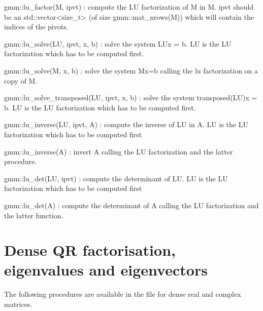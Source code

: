 \documentclass[11pt,a4paper]{article}
\begin{document}
\begin{cppcode}
gmm::lu_factor(M, ipvt) : compute the LU factorization of M in M. ipvt should be
                     an std::vector<size_t> (of size gmm::mat_nrows(M))
                     which will contain the indices of the pivots.

gmm::lu_solve(LU, ipvt, x, b) : solve the system LUx = b. LU is the LU
                           factorization which has to be computed first.

gmm::lu_solve(M, x, b) : solve the system Mx=b calling the lu factorization on
                    a copy of M.

gmm::lu_solve_transposed(LU, ipvt, x, b) : solve the system transposed(LU)x = b.
                                      LU is the LU factorization which
                                      has to be computed first.

gmm::lu_inverse(LU, ipvt, A) : compute the inverse of LU in A. LU is the LU
                          factorization which has to be computed first

gmm::lu_inverse(A) : invert A calling the LU factorization and the latter
                procedure.

gmm::lu_det(LU, ipvt) : compute the determinant of LU. LU is the LU
                   factorization which has to be computed first

gmm::lu_det(A) : compute the determinant of A calling the LU factorization
            and the latter function.
\end{cppcode}

\section{Dense QR factorisation, eigenvalues and eigenvectors}
The following procedures are available in the file  for dense real and complex matrices.
\end{document}
